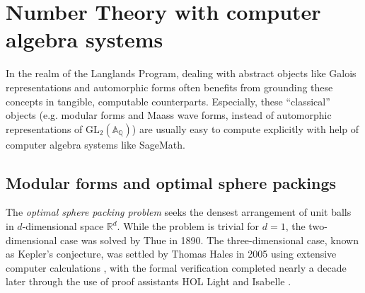 \documentclass[letterpaper, 10pt]{article}
\begin{document}



\section{Number Theory with computer algebra systems}

In the realm of the Langlands Program, dealing with abstract objects like Galois representations and automorphic forms often benefits from grounding these concepts in tangible, computable counterparts.
Especially, these ``classical'' objects (e.g. modular forms and Maass wave forms, instead of automorphic representations of $\mathrm{GL}_{2}(\mathbb{A}_{\mathbb{Q}})$) are usually easy to compute explicitly with help of computer algebra systems like SageMath.


\subsection{Modular forms and optimal sphere packings}
\label{subsec:algproof}

The \emph{optimal sphere packing problem} seeks the densest arrangement of unit balls in $d$-dimensional space $\mathbb{R}^{d}$.
While the problem is trivial for $d = 1$, the two-dimensional case was solved by Thue in 1890.
The three-dimensional case, known as Kepler's conjecture, was settled by Thomas Hales in 2005 using extensive computer calculations \cite{hales2005proof}, with the formal verification completed nearly a decade later through the use of proof assistants HOL Light and Isabelle \cite{hales2017formal}.
\end{document}
